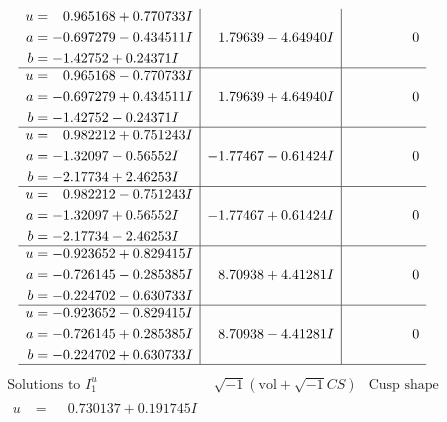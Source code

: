 \documentclass[1p]{elsarticle_modified}
\theoremstyle{definition}
\newcommand{\I}{\sqrt{-1}}
\begin{document}
$$\begin{array}{c|c|c}
\begin{aligned}
u &= \phantom{-}0.965168 + 0.770733 I \\
a &= -0.697279 - 0.434511 I \\
b &= -1.42752 + 0.24371 I\end{aligned}
 & \phantom{-}1.79639 - 4.64940 I & \phantom{-0.000000 } 0 \\ \hline\begin{aligned}
u &= \phantom{-}0.965168 - 0.770733 I \\
a &= -0.697279 + 0.434511 I \\
b &= -1.42752 - 0.24371 I\end{aligned}
 & \phantom{-}1.79639 + 4.64940 I & \phantom{-0.000000 } 0 \\ \hline\begin{aligned}
u &= \phantom{-}0.982212 + 0.751243 I \\
a &= -1.32097 - 0.56552 I \\
b &= -2.17734 + 2.46253 I\end{aligned}
 & -1.77467 - 0.61424 I & \phantom{-0.000000 } 0 \\ \hline\begin{aligned}
u &= \phantom{-}0.982212 - 0.751243 I \\
a &= -1.32097 + 0.56552 I \\
b &= -2.17734 - 2.46253 I\end{aligned}
 & -1.77467 + 0.61424 I & \phantom{-0.000000 } 0 \\ \hline\begin{aligned}
u &= -0.923652 + 0.829415 I \\
a &= -0.726145 - 0.285385 I \\
b &= -0.224702 - 0.630733 I\end{aligned}
 & \phantom{-}8.70938 + 4.41281 I & \phantom{-0.000000 } 0 \\ \hline\begin{aligned}
u &= -0.923652 - 0.829415 I \\
a &= -0.726145 + 0.285385 I \\
b &= -0.224702 + 0.630733 I\end{aligned}
 & \phantom{-}8.70938 - 4.41281 I & \phantom{-0.000000 } 0\\
 \hline 
 \end{array}$$\newpage$$\begin{array}{c|c|c}  
\text{Solutions to }I^u_{1}& \I (\text{vol} + \sqrt{-1}CS) & \text{Cusp shape}\\
 \hline 
\begin{aligned}
u &= \phantom{-}0.730137 + 0.191745 I \\

\end{aligned}
\end{array}$$
\end{document}
